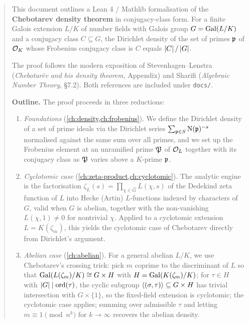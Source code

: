 
\blueprintfrontmatter

\begin{abstract}
This document outlines a Lean 4 / Mathlib formalisation of the
\textbf{Chebotarev density theorem} in conjugacy-class form. For a
finite Galois extension $L/K$ of number fields with Galois group
$G=\Gal{L/K}$ and a conjugacy class $C\subseteq G$, the Dirichlet
density of the set of primes $\fp$ of $\OK$ whose Frobenius conjugacy
class is $C$ equals $\abs{C}/\abs{G}$.

The proof follows the modern exposition of Stevenhagen--Lenstra
(\emph{Chebotarëv and his density theorem}, Appendix) and Sharifi
(\emph{Algebraic Number Theory}, \S{}7.2). Both references are included
under \texttt{docs/}.

\smallskip
\noindent\textbf{Outline.} The proof proceeds in three reductions:

\begin{enumerate}
\item \emph{Foundations}
(\cref{ch:density,ch:frobenius}). We define the Dirichlet density of a
set of prime ideals via the Dirichlet series
$\sum_{\fp\in S} \Norm{\fp}^{-s}$ normalised against the same sum over
all primes, and we set up the Frobenius element at an unramified prime
$\fP$ of $\Ocirc_L$ together with its conjugacy class as $\fP$ varies
above a $K$-prime $\fp$.

\item \emph{Cyclotomic case} (\cref{ch:zeta-product,ch:cyclotomic}). The
analytic engine is the factorisation
\(
  \zeta_L(s) = \prod_{\chi\in\widehat{G}} L(\chi, s)
\)
of the Dedekind zeta function of $L$ into Hecke (Artin) $L$-functions
indexed by characters of $G$, valid when $G$ is abelian, together with
the non-vanishing $L(\chi, 1)\ne 0$ for nontrivial $\chi$. Applied to a
cyclotomic extension $L=K(\zeta_m)$, this yields the cyclotomic case of
Chebotarev directly from Dirichlet's argument.

\item \emph{Abelian case} (\cref{ch:abelian}). For a general abelian
$L/K$, we use Chebotarev's crossing trick: pick $m$ coprime to the
discriminant of $L$ so that
$\Gal{L(\zeta_m)/K}\cong G\times H$ with $H=\Gal{K(\zeta_m)/K}$; for
$\tau\in H$ with $\abs{G}\mid\mathrm{ord}(\tau)$, the cyclic subgroup
$\ang{(\sigma,\tau)}\subseteq G\times H$ has trivial intersection with
$G\times\{1\}$, so the fixed-field extension is cyclotomic; the
cyclotomic case applies; summing over admissible $\tau$ and letting
$m\equiv 1\pmod{n^k}$ for $k\to\infty$ recovers the abelian density.


\end{enumerate}
\end{abstract}
